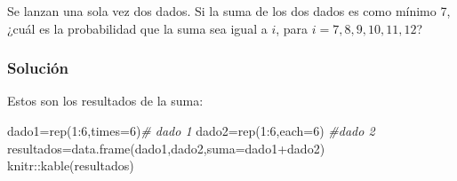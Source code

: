 \documentclass[
]{article}
\newenvironment{Shaded}{\begin{snugshade}}{\end{snugshade}}
\newcommand{\AttributeTok}[1]{\textcolor[rgb]{0.77,0.63,0.00}{#1}}
\newcommand{\CommentTok}[1]{\textcolor[rgb]{0.56,0.35,0.01}{\textit{#1}}}
\newcommand{\DecValTok}[1]{\textcolor[rgb]{0.00,0.00,0.81}{#1}}
\newcommand{\FunctionTok}[1]{\textcolor[rgb]{0.00,0.00,0.00}{#1}}
\newcommand{\NormalTok}[1]{#1}
\newcommand{\OtherTok}[1]{\textcolor[rgb]{0.56,0.35,0.01}{#1}}
\newcommand{\SpecialCharTok}[1]{\textcolor[rgb]{0.00,0.00,0.00}{#1}}
\begin{document}
Se lanzan una sola vez dos dados. Si la suma de los dos dados es como
mínimo 7, ¿cuál es la probabilidad que la suma sea igual a \(i\), para
\(i=7,8,9,10,11,12\)?

\hypertarget{soluciuxf3n-10}{%
\subsubsection{Solución}\label{soluciuxf3n-10}}

Estos son los resultados de la suma:

\begin{Shaded}
\begin{Highlighting}[]
\NormalTok{dado1}\OtherTok{=}\FunctionTok{rep}\NormalTok{(}\DecValTok{1}\SpecialCharTok{:}\DecValTok{6}\NormalTok{,}\AttributeTok{times=}\DecValTok{6}\NormalTok{)}\CommentTok{\# dado 1}
\NormalTok{dado2}\OtherTok{=}\FunctionTok{rep}\NormalTok{(}\DecValTok{1}\SpecialCharTok{:}\DecValTok{6}\NormalTok{,}\AttributeTok{each=}\DecValTok{6}\NormalTok{) }\CommentTok{\#dado 2}
\NormalTok{resultados}\OtherTok{=}\FunctionTok{data.frame}\NormalTok{(dado1,dado2,}\AttributeTok{suma=}\NormalTok{dado1}\SpecialCharTok{+}\NormalTok{dado2)}
\NormalTok{knitr}\SpecialCharTok{::}\FunctionTok{kable}\NormalTok{(resultados)}
\end{Highlighting}
\end{Shaded}
\end{document}
